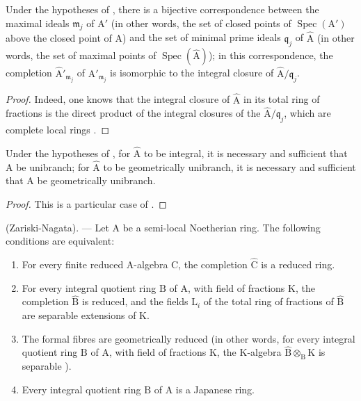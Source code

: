 \begin{corollary}[7.6.2]
\label{IV.7.6.2}
Under the hypotheses of , there is a bijective correspondence between the maximal ideals $\mathfrak{m}_j$ of $\mathrm{A}'$ \textup{(in other words, the set of closed points of $\operatorname{Spec}(\mathrm{A}')$ above the closed point of $\mathrm{A}$)} and the set of minimal prime ideals $\mathfrak{q}_j$ of $\widehat{\mathrm{A}}$ \textup{(in other words, the set of maximal points of $\operatorname{Spec}(\widehat{\mathrm{A}})$)}; in this correspondence, the completion $\widehat{\mathrm{A}}'_{\mathfrak{m}_j}$ of $\mathrm{A}'_{\mathfrak{m}_j}$ is isomorphic to the integral closure of $\widehat{\mathrm{A}}/\mathfrak{q}_j$.
\end{corollary}

\begin{proof}
  Indeed, one knows that the integral closure of $\widehat{\mathrm{A}}$ in its total ring of fractions is the direct product of the integral closures of the $\widehat{\mathrm{A}}/\mathfrak{q}_j$, which are complete local rings .
\end{proof}

\begin{corollary}[7.6.3]
\label{IV.7.6.3}
Under the hypotheses of , for $\widehat{\mathrm{A}}$ to be integral, it is necessary and sufficient that $\mathrm{A}$ be unibranch; for $\widehat{\mathrm{A}}$ to be geometrically unibranch, it is necessary and sufficient that $\mathrm{A}$ be geometrically unibranch.
\end{corollary}

\begin{proof}
This is a particular case of .
\end{proof}

\begin{theorem}[7.6.4]
\label{IV.7.6.4}
(Zariski-Nagata). --- Let $\mathrm{A}$ be a semi-local Noetherian ring. The following conditions are equivalent:
\begin{enumerate}[label=\emph{\alph*)}]
  \item For every finite reduced $\mathrm{A}$-algebra $\mathrm{C}$, the completion $\widehat{\mathrm{C}}$ is a reduced ring.
  \item[\rm a$'$)] For every integral quotient ring $\mathrm{B}$ of $\mathrm{A}$, with field of fractions $\mathrm{K}$, the completion $\widehat{\mathrm{B}}$ is reduced, and the fields $\mathrm{L}_i$ of the total ring of fractions of $\widehat{\mathrm{B}}$ are separable extensions of $\mathrm{K}$.
  \item[\rm a$''$)] The formal fibres are geometrically reduced \textup{(in other words, for every integral quotient ring $\mathrm{B}$ of $\mathrm{A}$, with field of fractions $\mathrm{K}$, the $\mathrm{K}$-algebra $\widehat{\mathrm{B}}\otimes_\mathrm{B}\mathrm{K}$ is separable )}.
  \item[\rm b)] Every integral quotient ring $\mathrm{B}$ of $\mathrm{A}$ is a Japanese ring.
\end{enumerate}
\end{theorem}

